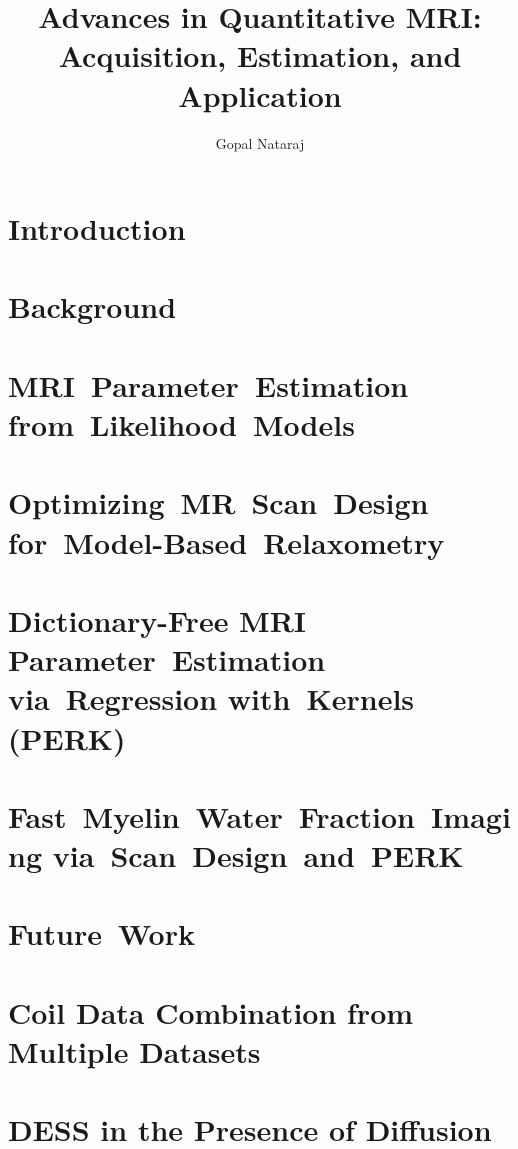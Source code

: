 \documentclass[draft]{../cls/thesis-umich}
\title{
	Advances in Quantitative MRI: \\
	Acquisition,
	Estimation,
	and 
	Application
}
\author{Gopal Nataraj}
\begin{document}
\chapter{Introduction}
\label{c,intro}


\chapter{Background}
\label{c,bkgrd}


\chapter{MRI~Parameter~Estimation from~Likelihood~Models}
\label{c,relax}


\chapter{Optimizing~MR~Scan~Design for~Model-Based~Relaxometry}
\label{c,scn-dsgn}


\chapter{Dictionary-Free MRI Parameter~Estimation via~Regression with~Kernels (PERK)}
\label{c,perk}


\chapter{Fast~Myelin~Water~Fraction~Imaging via~Scan~Design~and~PERK}
\label{c,mwf}


\chapter{Future~Work}
\label{c,future}


\appendix
\chapter{Coil Data Combination from Multiple Datasets}
\label{a,cc-multi}


\chapter{DESS in the Presence of Diffusion}
\label{a,dess-diff}




\end{document}
